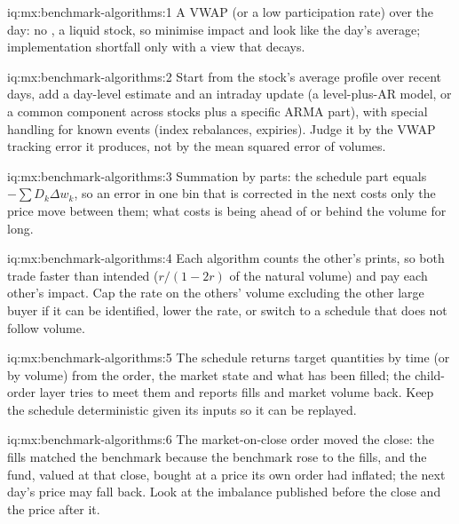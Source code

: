 \begin{solution}{iq:mx:benchmark-algorithms:1}
A VWAP (or a low participation rate) over the day: no , a liquid stock, so minimise impact and look like the day's average; implementation
shortfall only with a view that decays.
\end{solution}

\begin{solution}{iq:mx:benchmark-algorithms:2}
Start from the stock's average profile over recent days, add a day-level estimate and an intraday update (a level-plus-AR model, or a common
component across stocks plus a specific ARMA part), with special handling for known events (index rebalances, expiries). Judge it by the VWAP
tracking error it produces, not by the mean squared error of volumes.
\end{solution}

\begin{solution}{iq:mx:benchmark-algorithms:3}
Summation by parts: the schedule part equals $-\sum D_k\Delta w_k$, so an error in one bin that is corrected in the next costs only the price move
between them; what costs is being ahead of or behind the volume for long.
\end{solution}

\begin{solution}{iq:mx:benchmark-algorithms:4}
Each algorithm counts the other's prints, so both trade faster than intended ($r/(1-2r)$ of the natural volume) and pay each other's impact. Cap the
rate on the others' volume excluding the other large buyer if it can be identified, lower the rate, or switch to a schedule that does not follow volume.
\end{solution}

\begin{solution}{iq:mx:benchmark-algorithms:5}
The schedule returns target quantities by time (or by volume) from the order, the market state and what has been filled; the child-order layer
tries to meet them and reports fills and market volume back. Keep the schedule deterministic given its inputs so it can be replayed.
\end{solution}

\begin{solution}{iq:mx:benchmark-algorithms:6}
The market-on-close order moved the close: the fills matched the benchmark because the benchmark rose to the fills, and the fund, valued at that
close, bought at a price its own order had inflated; the next day's price may fall back. Look at the imbalance published before the close and the
price after it.
\end{solution}
